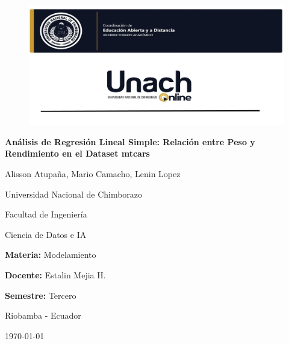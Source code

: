 \documentclass[12pt, letterpaper]{article}
\newcommand{\titulo}{Análisis de Regresión Lineal Simple: Relación entre Peso y Rendimiento
en el Dataset mtcars}
\newcommand{\autores}{Alisson Atupaña, Mario Camacho, Lenin Lopez}
\newcommand{\afiliacion}{Universidad Nacional de Chimborazo}
\newcommand{\facultad}{Facultad de Ingeniería}
\newcommand{\carrera}{Ciencia de Datos e IA}
\newcommand{\materia}{Modelamiento}
\newcommand{\docente}{Estalin Mejia H.}
\newcommand{\semestre}{Tercero}
\newcommand{\ciudad}{Riobamba - Ecuador}
\begin{document}
    \begin{titlepage}
        \thispagestyle{fancy}
        \fancyhf{} \fancyhead[R]{\thepage}

        \centering

        
        \vspace{0.5cm}
        \begin{figure}[H]
            \centering
            \includegraphics[width=1\linewidth]{Graficos/Imagen1.png}
        \end{figure}
        
        {\Large\bfseries \titulo \par}

        \vspace{2cm}

        {\large \autores \par}

        \vspace{0.5cm}

        {\large \afiliacion \par} {\normalsize \facultad \par}
        {\normalsize \carrera \par}

        \vspace{1cm}

        {\normalsize \textbf{Materia:} \materia \par}
        {\normalsize \textbf{Docente:} \docente \par}
        {\normalsize \textbf{Semestre:} \semestre \par}

        \vfill

        {\normalsize \ciudad \par} {\normalsize \today \par}
    \end{titlepage}
\end{document}
